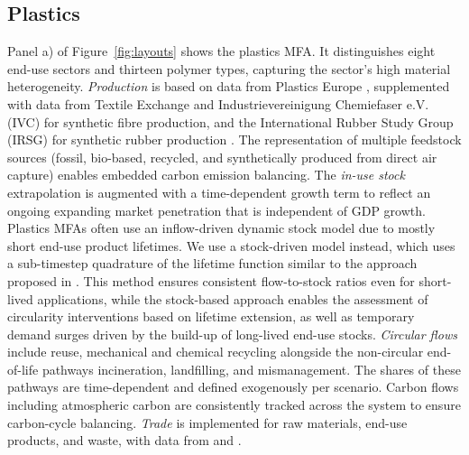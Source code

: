\documentclass[pdflatex]{sn-jnl}
\begin{document}
\subsection{Plastics}\label{sec:plastics}
Panel a) of Figure~\ref{fig:layouts} shows the plastics MFA. It distinguishes eight end-use sectors and thirteen polymer types, capturing the sector’s high material heterogeneity. \textit{Production} is based on data from Plastics Europe \parencite{plasticseuropeKnowledgeHubPlastics2025}, supplemented with data from Textile Exchange \parencite{textileexchange} and Industrievereinigung Chemiefaser e.V. (IVC) \parencite{zotero-item-78302} for synthetic fibre production, and the International Rubber Study Group (IRSG) for synthetic rubber production \parencite{irsg}. The representation of multiple feedstock sources (fossil, bio-based, recycled, and synthetically produced from direct air capture) enables embedded carbon emission balancing. The \textit{in-use stock} extrapolation is augmented with a time-dependent growth term to reflect an ongoing expanding market penetration that is independent of GDP growth. Plastics MFAs often use an inflow-driven dynamic stock model due to mostly short end-use product lifetimes. We use a stock-driven model instead, which uses a sub-timestep quadrature of the lifetime function similar to the approach proposed in \textcite{cencic2025}. This method ensures consistent flow-to-stock ratios even for short-lived applications, while the stock-based approach enables the assessment of circularity interventions based on lifetime extension, as well as temporary demand surges driven by the build-up of long-lived end-use stocks. \textit{Circular flows} include reuse, mechanical and chemical recycling alongside the non-circular end-of-life pathways incineration, landfilling, and mismanagement. The shares of these pathways are time-dependent and defined exogenously per scenario. Carbon flows including atmospheric carbon are consistently tracked across the system to ensure carbon-cycle balancing. \textit{Trade} is implemented for raw materials, end-use products, and waste, with data from \textcite{gaulier2010} and \textcite{unepNationalGuidancePlastic2020}.
\end{document}

